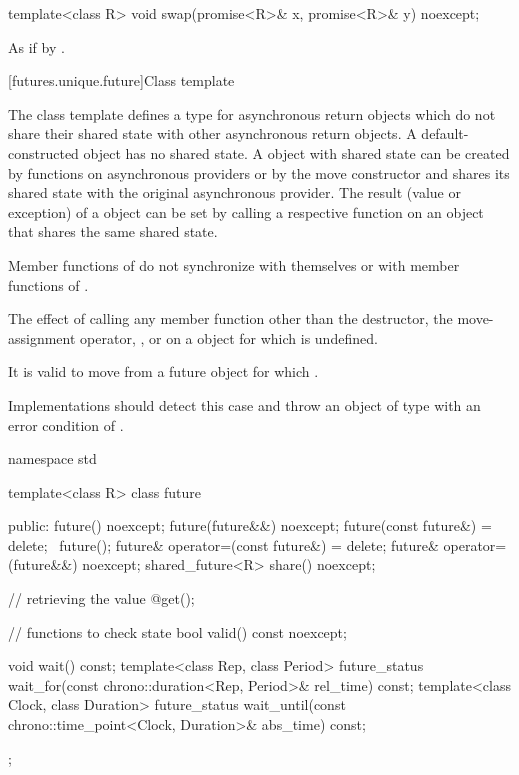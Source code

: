 %
\begin{itemdecl}
template<class R>
  void swap(promise<R>& x, promise<R>& y) noexcept;
\end{itemdecl}

\begin{itemdescr}
\pnum
\effects
As if by .
\end{itemdescr}

[futures.unique.future]{Class template }

\pnum
The class template  defines a type for asynchronous return objects which
do not share their shared state with other asynchronous return objects.
A default-constructed  object has no
shared state. A  object with shared state can be created by
functions on asynchronous providers or by the move constructor
and shares its shared state with
the original asynchronous provider. The result (value or exception) of
a  object
can be
set by
calling a respective function on an
object that shares the same
shared state.

\pnum
\begin{note}
Member functions of  do not synchronize with themselves or with
member functions of .
\end{note}

\pnum
The effect of calling any member function other than the destructor, the
move-assignment operator, , or  on a  object for which
is undefined.
\begin{note}
It is valid to move from a future object for which .
\end{note}
\begin{note}
Implementations should detect this case and throw an object of type
 with an error condition of .
\end{note}

%
\begin{codeblock}
namespace std {
  template<class R>
  class future {
  public:
    future() noexcept;
    future(future&&) noexcept;
    future(const future&) = delete;
    ~future();
    future& operator=(const future&) = delete;
    future& operator=(future&&) noexcept;
    shared_future<R> share() noexcept;

    // retrieving the value
    @\seebelow@ get();

    // functions to check state
    bool valid() const noexcept;

    void wait() const;
    template<class Rep, class Period>
      future_status wait_for(const chrono::duration<Rep, Period>& rel_time) const;
    template<class Clock, class Duration>
      future_status wait_until(const chrono::time_point<Clock, Duration>& abs_time) const;
  };
}
\end{codeblock}

